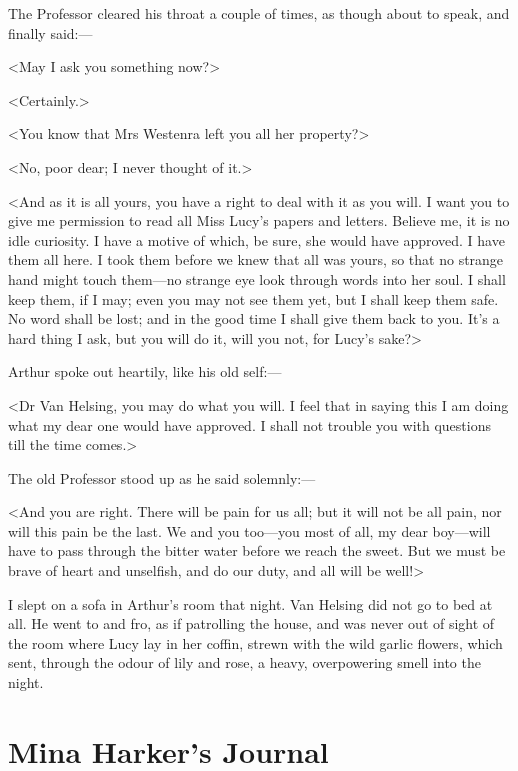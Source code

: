 The Professor cleared his throat a couple of times, as though about to speak, and finally said:—

<May I ask you something now?>

<Certainly.>

<You know that Mrs Westenra left you all her property?>

<No, poor dear; I never thought of it.>

<And as it is all yours, you have a right to deal with it as you will. I want you to give me permission to read all Miss Lucy's papers and letters. Believe me, it is no idle curiosity. I have a motive of which, be sure, she would have approved. I have them all here. I took them before we knew that all was yours, so that no strange hand might touch them—no strange eye look through words into her soul. I shall keep them, if I may; even you may not see them yet, but I shall keep them safe. No word shall be lost; and in the good time I shall give them back to you. It's a hard thing I ask, but you will do it, will you not, for Lucy's sake?>

Arthur spoke out heartily, like his old self:—

<Dr Van Helsing, you may do what you will. I feel that in saying this I am doing what my dear one would have approved. I shall not trouble you with questions till the time comes.>

The old Professor stood up as he said solemnly:—

<And you are right. There will be pain for us all; but it will not be all pain, nor will this pain be the last. We and you too—you most of all, my dear boy—will have to pass through the bitter water before we reach the sweet. But we must be brave of heart and unselfish, and do our duty, and all will be well!>

I slept on a sofa in Arthur's room that night. Van Helsing did not go to bed at all. He went to and fro, as if patrolling the house, and was never out of sight of the room where Lucy lay in her coffin, strewn with the wild garlic flowers, which sent, through the odour of lily and rose, a heavy, overpowering smell into the night.

\section{Mina Harker's Journal}

